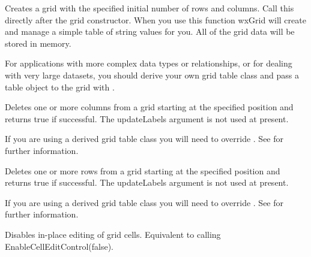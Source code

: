 Creates a grid with the specified initial number of rows and columns.
Call this directly after the grid constructor. When you use this
function wxGrid will create and manage a simple table of string values
for you. All of the grid data will be stored in memory.

For applications with more complex data types or relationships, or for
dealing with very large datasets, you should derive your own grid table
class and pass a table object to the grid with .



\label{wxgriddeletecols}


Deletes one or more columns from a grid starting at the specified position and returns
true if successful. The updateLabels argument is not used at present.

If you are using a derived grid table class you will need to override
. See
 for further information.



\label{wxgriddeleterows}


Deletes one or more rows from a grid starting at the specified position and returns
true if successful. The updateLabels argument is not used at present.

If you are using a derived grid table class you will need to override
. See
 for further information.



\label{wxgriddisablecelleditcontrol}


Disables in-place editing of grid cells.
Equivalent to calling EnableCellEditControl(false).



\label{wxgriddisabledragcolmove}


